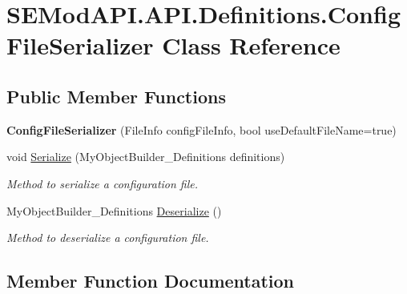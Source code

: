 \hypertarget{class_s_e_mod_a_p_i_1_1_a_p_i_1_1_definitions_1_1_config_file_serializer}{}\section{S\+E\+Mod\+A\+P\+I.\+A\+P\+I.\+Definitions.\+Config\+File\+Serializer Class Reference}
\label{class_s_e_mod_a_p_i_1_1_a_p_i_1_1_definitions_1_1_config_file_serializer}
\subsection*{Public Member Functions}
\begin{DoxyCompactItemize}
\item 
\hypertarget{class_s_e_mod_a_p_i_1_1_a_p_i_1_1_definitions_1_1_config_file_serializer_a009bc6479a163f373639609b3156672c}{}{\bfseries Config\+File\+Serializer} (File\+Info config\+File\+Info, bool use\+Default\+File\+Name=true)\label{class_s_e_mod_a_p_i_1_1_a_p_i_1_1_definitions_1_1_config_file_serializer_a009bc6479a163f373639609b3156672c}

\item 
void \hyperlink{class_s_e_mod_a_p_i_1_1_a_p_i_1_1_definitions_1_1_config_file_serializer_aa27def4995c05849bbe2e6a5e39f1f6e}{Serialize} (My\+Object\+Builder\+\_\+\+Definitions definitions)
\begin{DoxyCompactList}\small\item\em Method to serialize a configuration file. \end{DoxyCompactList}\item 
My\+Object\+Builder\+\_\+\+Definitions \hyperlink{class_s_e_mod_a_p_i_1_1_a_p_i_1_1_definitions_1_1_config_file_serializer_ac3c69da8b4b2464608e5d4568c2e5f9a}{Deserialize} ()
\begin{DoxyCompactList}\small\item\em Method to deserialize a configuration file. \end{DoxyCompactList}\end{DoxyCompactItemize}


\subsection{Member Function Documentation}
\hypertarget{class_s_e_mod_a_p_i_1_1_a_p_i_1_1_definitions_1_1_config_file_serializer_ac3c69da8b4b2464608e5d4568c2e5f9a}{}
